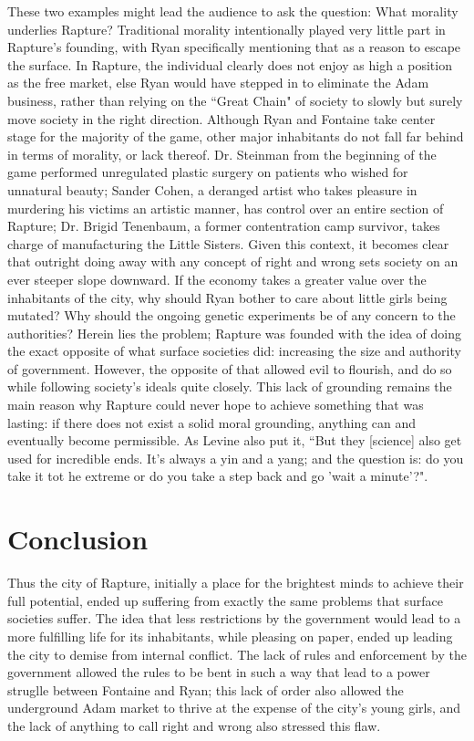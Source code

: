 \documentclass{article}
\begin{document}
These two examples might lead the audience to ask the question: What morality underlies Rapture? Traditional 
morality intentionally played very little part in Rapture's founding, with Ryan specifically mentioning that
as a reason to escape the surface. In Rapture, the individual clearly does not enjoy as high a position as 
the free market, else Ryan would have stepped in to eliminate the Adam business, rather than relying on the 
``Great Chain" of society to slowly but surely move society in the right direction. Although Ryan and 
Fontaine take center stage for the majority of the game, other major inhabitants do not fall far behind 
in terms of morality, or lack thereof. Dr. Steinman from the beginning of the game performed unregulated
plastic surgery on patients who wished for unnatural beauty; Sander Cohen, a deranged artist who takes pleasure
in murdering his victims an artistic manner, has control over an entire section of Rapture; 
Dr. Brigid Tenenbaum, a former contentration
camp survivor, takes charge of manufacturing the Little Sisters. Given this context, it becomes clear that 
outright doing away with any concept of right and wrong sets society on an ever steeper slope downward. If 
the economy takes a greater value over the inhabitants of the city, why should Ryan bother to care about little 
girls being mutated? Why should the ongoing genetic experiments be of any concern to the authorities? Herein
lies the problem; Rapture was founded with the idea of doing the exact opposite of what surface societies did:
increasing the size and authority of government. However, the opposite of that allowed evil to flourish, and do
so while following society's ideals quite closely. This lack of grounding remains the main reason why Rapture
could never hope to achieve something that was lasting: if there does not exist a solid moral grounding,
anything can and eventually become permissible. As Levine also put it, ``But they [science] also get used for 
incredible ends. It's always a yin and a yang; and the question is: do you take it tot he extreme or do you take 
a step back and go 'wait a minute'?"\textcite{LevineInterview}. 

\section{Conclusion}
Thus the city of Rapture, initially a place for the brightest minds to achieve their full potential, ended up 
suffering from exactly the same problems that surface societies suffer. The idea that less restrictions by the 
government would lead to a more fulfilling life for its inhabitants, while pleasing on paper, ended up leading
the city to demise from internal conflict. The lack of rules and  enforcement by the government allowed the rules 
to be bent in such a way that lead to a power struglle between Fontaine and Ryan; this lack of order also
allowed the underground Adam market to thrive at the expense of the city's young girls, and the lack of anything 
to call right and wrong also stressed this flaw.
\end{document}
